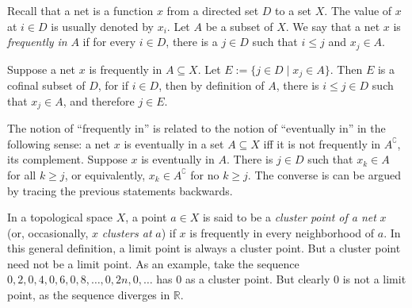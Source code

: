 \documentclass[12pt]{article}
\begin{document}
Recall that a net is a function $x$ from a directed set $D$ to a set $X$.  The value of $x$ at $i\in D$ is usually denoted by $x_i$.  Let $A$ be a subset of $X$.  We say that a net $x$ is \emph{frequently in} $A$ if for every $i\in D$, there is a $j\in D$ such that $i\le j$ and $x_j\in A$.

Suppose a net $x$ is frequently in $A\subseteq X$.  Let $E:=\lbrace j\in D\mid x_j\in A\rbrace$.  Then $E$ is a cofinal subset of $D$, for if $i\in D$, then by definition of $A$, there is $i\le j\in D$ such that $x_j\in A$, and therefore $j\in E$.

The notion of ``frequently in'' is related to the notion of ``eventually in'' in the following sense: a net $x$ is eventually in a set $A\subseteq X$ iff it is not frequently in $A^{\complement}$, its complement.  Suppose $x$ is eventually in $A$.  There is $j\in D$ such that $x_k\in A$ for all $k\ge j$, or equivalently, $x_k\in A^{\complement}$ for no $k\ge j$.  The converse is can be argued by tracing the previous statements backwards.

In a topological space $X$, a point $a\in X$ is said to be a \emph{cluster point of a net} $x$ (or, occasionally, $x$ \emph{clusters at} $a$) if $x$ is frequently in every neighborhood of $a$.  In this general definition, a limit point is always a cluster point.  But a cluster point need not be a limit point.  As an example, take the sequence $0,2,0,4,0,6,0,8,\ldots,0,2n,0,\ldots$ has $0$ as a cluster point.  But clearly $0$ is not a limit point, as the sequence diverges in $\mathbb{R}$.
\end{document}
